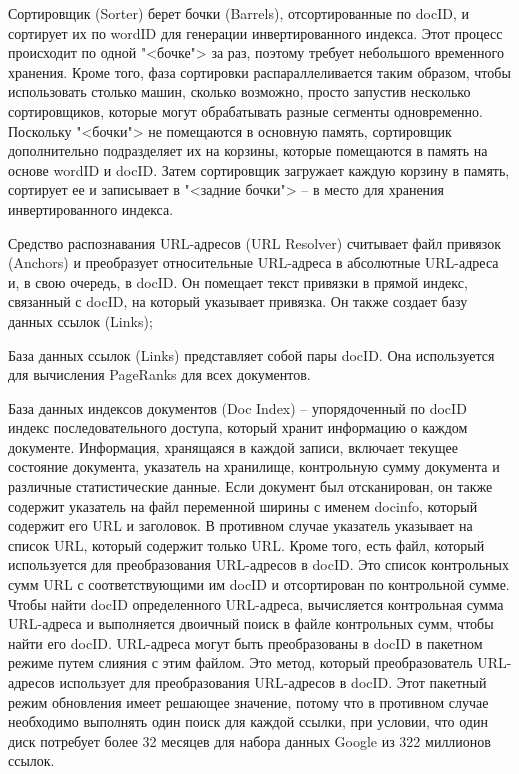 Сортировщик (Sorter) берет бочки (Barrels), отсортированные по docID, и сортирует их по wordID для генерации инвертированного индекса. Этот процесс происходит по одной "<бочке"> за раз, поэтому требует небольшого временного хранения. Кроме того, фаза сортировки распараллеливается таким образом, чтобы использовать столько машин, сколько возможно, просто запустив несколько сортировщиков, которые могут обрабатывать разные сегменты одновременно. Поскольку "<бочки"> не помещаются в основную память, сортировщик дополнительно подразделяет их на корзины, которые помещаются в память на основе wordID и docID. Затем сортировщик загружает каждую корзину в память, сортирует ее и записывает в "<задние бочки"> -- в место для хранения инвертированного индекса.

Средство распознавания URL-адресов (URL Resolver) считывает файл привязок (Anchors) и преобразует относительные URL-адреса в абсолютные URL-адреса и, в свою очередь, в docID. Он помещает текст привязки в прямой индекс, связанный с docID, на который указывает привязка. Он также создает базу данных ссылок (Links);

База данных ссылок (Links) представляет собой пары docID. Она используется для вычисления PageRanks для всех документов.

База данных индексов документов (Doc Index) -- упорядоченный по docID индекс последовательного доступа, который хранит информацию о каждом документе. Информация, хранящаяся в каждой записи, включает текущее состояние документа, указатель на хранилище, контрольную сумму документа и различные статистические данные. Если документ был отсканирован, он также содержит указатель на файл переменной ширины с именем docinfo, который содержит его URL и заголовок. В противном случае указатель указывает на список URL, который содержит только URL. Кроме того, есть файл, который используется для преобразования URL-адресов в docID. Это список контрольных сумм URL с соответствующими им docID и отсортирован по контрольной сумме. Чтобы найти docID определенного URL-адреса, вычисляется контрольная сумма URL-адреса и выполняется двоичный поиск в файле контрольных сумм, чтобы найти его docID. URL-адреса могут быть преобразованы в docID в пакетном режиме путем слияния с этим файлом. Это метод, который преобразователь URL-адресов использует для преобразования URL-адресов в docID. Этот пакетный режим обновления имеет решающее значение, потому что в противном случае необходимо выполнять один поиск для каждой ссылки, при условии, что один диск потребует более 32 месяцев для набора данных Google из 322 миллионов ссылок.

